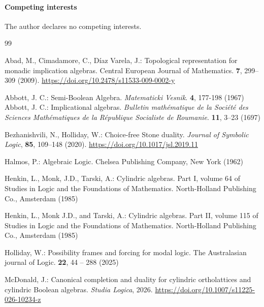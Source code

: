 \documentclass[reqno]{amsart}
\theoremstyle{plain}
\theoremstyle{definition}
\begin{document}
\paragraph{\textbf{Competing interests}} The author declares no competing interests. 
\begin{thebibliography}{99}
 \setlength{\itemsep}{0em}
    \setlength{\parskip}{0em}



 Abad, M., Cimadamore, C., Díaz Varela, J.: Topological representation for monadic implication algebras. Central European Journal of Mathematics. \textbf{7}, 299--309 (2009). \url{https://doi.org/10.2478/s11533-009-0002-y}
    
     Abbott, J. C.: Semi-Boolean Algebra. \emph{Matematicki Vesnik}. \textbf{4}, 177-198 (1967) 
     Abbott, J. C.: Implicational algebras. \emph{Bulletin math\'ematique de la Soci\'et\'e des Sciences Mathématiques de la R\'epublique Socialiste de Roumanie}. \textbf{11}, 3--23 (1697)
   



 Bezhanishvili, N., Holliday, W.: Choice-free Stone duality. \emph{Journal of Symbolic Logic}, \textbf{85}, 109--148 (2020). \url{https://doi.org/10.1017/jsl.2019.11} 






  Halmos, P.: Algebraic Logic. Chelsea Publishing Company, New York (1962)

  Henkin, L., Monk, J.D., Tarski, A.: Cylindric algebras. Part I, volume 64 of Studies
in Logic and the Foundations of Mathematics. North-Holland Publishing Co., Amsterdam (1985)

 Henkin, L., Monk J.D., and Tarski, A.: Cylindric algebras. Part II, volume 115 of Studies
in Logic and the Foundations of Mathematics. North-Holland Publishing Co., Amsterdam (1985)


 Holliday, W.: Possibility frames and forcing for modal logic. The Australasian journal of Logic. \textbf{22}, 44 -- 288 (2025) 

  McDonald, J.: Canonical completion and duality for cylindric ortholattices and cylindric Boolean algebras. \emph{Studia Logica}, 2026. \url{ https://doi.org/10.1007/s11225-026-10234-z}


    \end{thebibliography}
\end{document}
